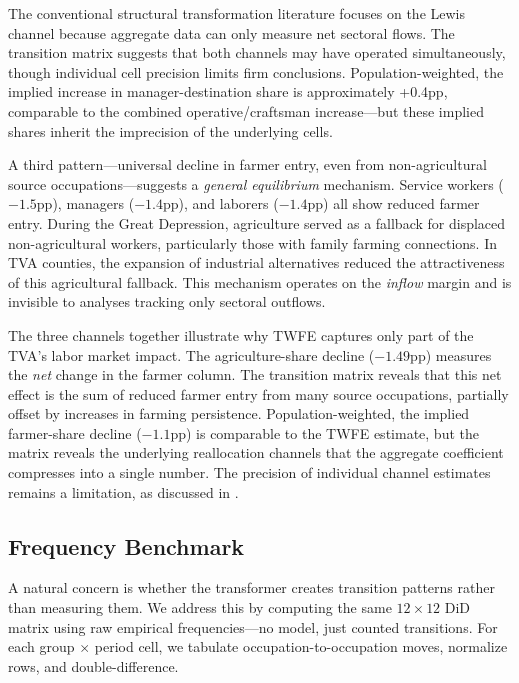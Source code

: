 \documentclass[12pt]{article}
\begin{document}
The conventional structural transformation literature focuses on the Lewis channel because aggregate data can only measure net sectoral flows. The transition matrix suggests that both channels may have operated simultaneously, though individual cell precision limits firm conclusions. Population-weighted, the implied increase in manager-destination share is approximately +0.4pp, comparable to the combined operative/craftsman increase---but these implied shares inherit the imprecision of the underlying cells.

A third pattern---universal decline in farmer entry, even from non-agricultural source occupations---suggests a \textit{general equilibrium} mechanism. Service workers ($-1.5$pp), managers ($-1.4$pp), and laborers ($-1.4$pp) all show reduced farmer entry. During the Great Depression, agriculture served as a fallback for displaced non-agricultural workers, particularly those with family farming connections. In TVA counties, the expansion of industrial alternatives reduced the attractiveness of this agricultural fallback. This mechanism operates on the \textit{inflow} margin and is invisible to analyses tracking only sectoral outflows.

The three channels together illustrate why TWFE captures only part of the TVA's labor market impact. The agriculture-share decline ($-1.49$pp) measures the \textit{net} change in the farmer column. The transition matrix reveals that this net effect is the sum of reduced farmer entry from many source occupations, partially offset by increases in farming persistence. Population-weighted, the implied farmer-share decline ($-1.1$pp) is comparable to the TWFE estimate, but the matrix reveals the underlying reallocation channels that the aggregate coefficient compresses into a single number. The precision of individual channel estimates remains a limitation, as discussed in .

\subsection{Frequency Benchmark}

A natural concern is whether the transformer creates transition patterns rather than measuring them. We address this by computing the same $12 \times 12$ DiD matrix using raw empirical frequencies---no model, just counted transitions. For each group $\times$ period cell, we tabulate occupation-to-occupation moves, normalize rows, and double-difference.
\end{document}
